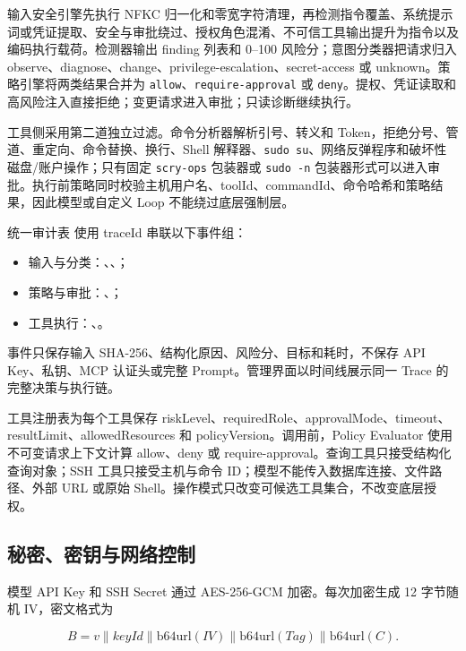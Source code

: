 \documentclass[conference,10pt]{IEEEtran}
\newcommand{\code}[1]{\texttt{#1}}
\newcommand{\filepath}[1]{\path{#1}}
\begin{document}
输入安全引擎先执行 NFKC 归一化和零宽字符清理，再检测指令覆盖、系统提示词或凭证提取、安全与审批绕过、授权角色混淆、不可信工具输出提升为指令以及编码执行载荷。检测器输出 finding 列表和 0--100 风险分；意图分类器把请求归入 observe、diagnose、change、privilege-escalation、secret-access 或 unknown。策略引擎将两类结果合并为 \code{allow}、\code{require-approval} 或 \code{deny}。提权、凭证读取和高风险注入直接拒绝；变更请求进入审批；只读诊断继续执行。

工具侧采用第二道独立过滤。命令分析器解析引号、转义和 Token，拒绝分号、管道、重定向、命令替换、换行、Shell 解释器、\code{sudo su}、网络反弹程序和破坏性磁盘/账户操作；只有固定 \code{scry-ops} 包装器或 \code{sudo -n} 包装器形式可以进入审批。执行前策略同时校验主机用户名、toolId、commandId、命令哈希和策略结果，因此模型或自定义 Loop 不能绕过底层强制层。

统一审计表 \filepath{scry\_security\_audit\_events} 使用 traceId 串联以下事件组：
\begin{itemize}
  \item 输入与分类：、、；
  \item 策略与审批：、；
  \item 工具执行：、。
\end{itemize}
事件只保存输入 SHA-256、结构化原因、风险分、目标和耗时，不保存 API Key、私钥、MCP 认证头或完整 Prompt。管理界面以时间线展示同一 Trace 的完整决策与执行链。

工具注册表为每个工具保存 riskLevel、requiredRole、approvalMode、timeout、resultLimit、allowedResources 和 policyVersion。调用前，Policy Evaluator 使用不可变请求上下文计算 allow、deny 或 require-approval。查询工具只接受结构化查询对象；SSH 工具只接受主机与命令 ID；模型不能传入数据库连接、文件路径、外部 URL 或原始 Shell。操作模式只改变可候选工具集合，不改变底层授权。

\subsection{秘密、密钥与网络控制}

模型 API Key 和 SSH Secret 通过 AES-256-GCM 加密。每次加密生成 12 字节随机 IV，密文格式为

\begin{equation}
  B = v \parallel keyId \parallel \mathrm{b64url}(IV) \parallel
  \mathrm{b64url}(Tag) \parallel \mathrm{b64url}(C).
\end{equation}
\end{document}
